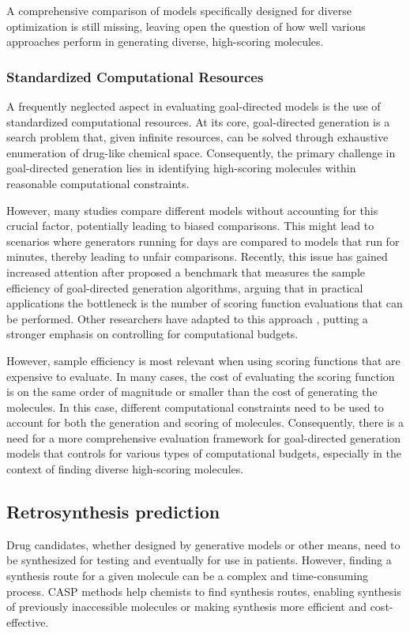 A comprehensive comparison of models specifically designed for diverse optimization is still
missing, leaving open the question of how well various approaches perform in generating diverse,
high-scoring molecules.

\subsubsection{Standardized Computational Resources}
A frequently neglected aspect in evaluating goal-directed models is the use of standardized
computational resources. At its core, goal-directed generation is a search problem
that, given infinite resources, can be solved through exhaustive enumeration of drug-like chemical space.
Consequently, the primary challenge in goal-directed generation lies in identifying high-scoring molecules
within reasonable computational constraints.

However, many studies compare different models without accounting for this crucial factor,
potentially leading to biased comparisons. This might lead to scenarios where generators running for
days are compared to models that run for minutes, thereby leading to unfair comparisons. Recently,
this issue has gained increased attention after \citep{gaoSampleEfficiencyMatters2022} proposed a
benchmark that measures the sample efficiency of goal-directed generation algorithms, arguing that
in practical applications the bottleneck is the number of scoring function evaluations that can be
performed. Other researchers have adapted to this approach
\citep{thomasReevaluatingSampleEfficiency2022,thomasAugmentedHillClimbIncreases2022,guoAugmentedMemoryCapitalizing2023},
putting a stronger emphasis on controlling for computational budgets.

However, sample efficiency is most relevant when using scoring functions that are expensive to
evaluate. In many cases, the cost of evaluating the scoring function is on the same order of
magnitude or smaller than the cost of generating the molecules. In this case, different
computational constraints need to be used to account for both the generation and scoring of
molecules. Consequently, there is a need for a more comprehensive evaluation framework for
goal-directed generation models that controls for various types of computational budgets, especially
in the context of finding diverse high-scoring molecules.

\subsection{Retrosynthesis prediction}
Drug candidates, whether designed by generative models or other means, need to be
synthesized for testing and eventually for use in patients. However, finding a synthesis route for a
given molecule can be a complex and time-consuming process. \Ac{CASP} methods help
chemists to find synthesis routes, enabling synthesis of previously inaccessible molecules or making
synthesis more efficient and cost-effective.

